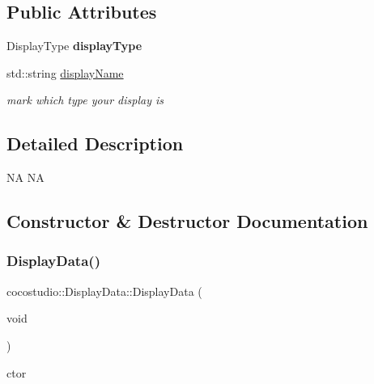 \subsection*{Public Attributes}
\begin{DoxyCompactItemize}
\item 
\mbox{\label{classcocostudio_1_1DisplayData_a4c92bb97806be9b377928d34636b8ae5}} 
Display\+Type {\bfseries display\+Type}
\item 
\mbox{\label{classcocostudio_1_1DisplayData_a695d11e0f04eb3e2b2278c67df4c4763}} 
std\+::string \hyperlink{classcocostudio_1_1DisplayData_a695d11e0f04eb3e2b2278c67df4c4763}{display\+Name}
\begin{DoxyCompactList}\small\item\em mark which type your display is \end{DoxyCompactList}\end{DoxyCompactItemize}


\subsection{Detailed Description}
NA  NA 

\subsection{Constructor \& Destructor Documentation}
\mbox{\label{classcocostudio_1_1DisplayData_ab126e08794f485181ead1f8cf40f5a7d}} 
\subsubsection{\texorpdfstring{Display\+Data()}{DisplayData()}\hspace{0.1cm}{\footnotesize\ttfamily [1/2]}}
{\footnotesize\ttfamily cocostudio\+::\+Display\+Data\+::\+Display\+Data (\begin{DoxyParamCaption}\item[{void}]{ }\end{DoxyParamCaption})}

ctor \mbox{\label{classcocostudio_1_1DisplayData_ad5ac2420f0ca264f9a341b7c682dca93}} 

